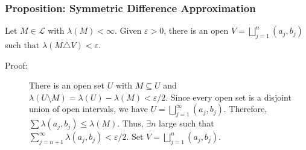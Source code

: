 \documentclass[10pt]{extarticle}
\begin{document}
  \subsubsection{Proposition: Symmetric Difference Approximation}%
  Let $M\in\mathcal{L}$ with $\lambda(M) < \infty$. Given $\varepsilon > 0$, there is an open $V = \bigsqcup_{j=1}^{n}(a_j,b_j)$ such that $\lambda(M\triangle V) < \varepsilon$.
  \begin{description}
    \item[Proof:] There is an open set $U$ with $M\subseteq U$ and $\lambda(U\setminus M) = \lambda(U) - \lambda(M) < \varepsilon/2$. Since every open set is a disjoint union of open intervals, we have $U = \bigsqcup_{j=1}^{\infty}(a_j,b_j)$. Therefore, $\sum \lambda(a_j,b_j) \leq \lambda(M)$. Thus, $\exists n$ large such that $\sum_{j=n+1}^{\infty}\lambda(a_j,b_j) < \varepsilon/2$. Set $V = \bigsqcup_{j=1}^{n}(a_j,b_j)$.
  \end{description}
\end{document}
